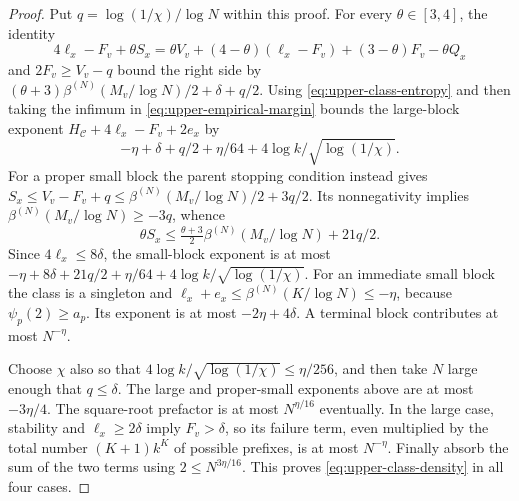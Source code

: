 \begin{proof}
Put $q=\log(1/\chi)/\log N$ within this proof.
For every $\theta\in[3,4]$, the identity
\[
 4\ell_x-F_v+\theta S_x
 =\theta V_v+(4-\theta)(\ell_x-F_v)
                         +(3-\theta)F_v-\theta Q_x
\]
and $2F_v\ge V_v-q$ bound the right side by
$(\theta+3)\beta^{(N)}(M_v/\log N)/2+\delta+q/2$.
Using \eqref{eq:upper-class-entropy} and then taking the infimum
in \eqref{eq:upper-empirical-margin} bounds the large-block exponent
$H_{\mathcal C}+4\ell_x-F_v+2e_x$ by
\[
 -\eta+\delta+q/2+\eta/64+4\log k/\sqrt{\log(1/\chi)}.
\]
For a proper small block the parent stopping condition instead gives
$S_x\le V_v-F_v+q\le\beta^{(N)}(M_v/\log N)/2+3q/2$.
Its nonnegativity implies $\beta^{(N)}(M_v/\log N)\ge-3q$, whence
\[
 \theta S_x\le\tfrac{\theta+3}{2}\beta^{(N)}(M_v/\log N)+21q/2.
\]
Since $4\ell_x\le8\delta$, the small-block exponent is at most
$-\eta+8\delta+21q/2+\eta/64+4\log k/\sqrt{\log(1/\chi)}$.
For an immediate small block the class is a singleton and
$\ell_x+e_x\le\beta^{(N)}(K/\log N)\le-\eta$, because
$\psi_p(2)\ge a_p$. Its exponent is at most $-2\eta+4\delta$.
A terminal block contributes at most $N^{-\eta}$.

Choose $\chi$ also so that
$4\log k/\sqrt{\log(1/\chi)}\le\eta/256$, and then take $N$
large enough that $q\le\delta$. The large and proper-small
exponents above are at most $-3\eta/4$. The square-root prefactor
is at most $N^{\eta/16}$ eventually. In the large case, stability
and $\ell_x\ge2\delta$ imply $F_v>\delta$, so its failure term,
even multiplied by the total number $(K+1)k^K$ of possible prefixes,
is at most $N^{-\eta}$. Finally absorb the sum of the two terms
using $2\le N^{3\eta/16}$. This proves
\eqref{eq:upper-class-density} in all four cases.
\end{proof}

